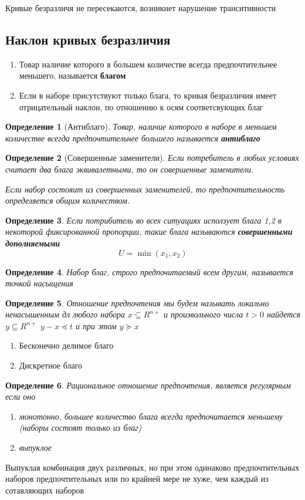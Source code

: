 \documentclass[14pt]{extarticle}
\newtheorem{definition}{Определение}
\begin{document}
	Кривые безразличя не пересекаются, возникнет нарушение транситивности
	\subsection{Наклон кривых безразличия}
	\begin{enumerate}
		\item Товар наличие которого в большем количестве
			всегда предпочтительнее меньшего, называется
			\textbf{благом}
		\item Если в наборе присутствуют только блага,
			то кривая безразличия имеет отрицательный
			наклон, по отношению к 
			осям соответсвующих благ
	\end{enumerate}
	\begin{definition}[Антиблаго]
		Товар, наличие которого
		в наборе в меньшем количестве всегда предпочтительнее большего называется \textbf{антиблаго}
	\end{definition}
	\begin{definition}[Совершенные заменители]
		Если потребитель в любых
		условиях считает два блага эквивалетными,
		то он совершенные заменители.

		Если набор состояит из совершенных
		заменителей, то предпочтительность определяется
		общим количеством.
	\end{definition}
	\begin{definition}
		Если потрибитель во всех ситуациях
		исползует блага 1,2 в некоторой
		фиксированной пропорции,
		такие блага называются \textbf{совершенными дополняемыми}
		\begin{equation} 
			U = \min(x_1,x_2)
		\end{equation} 
	\end{definition}
	\begin{definition}
		Набор благ, строго предпочитаемый всем
		другим, называется точкой насыщения
	\end{definition}
	\begin{definition}
		Отношение предпочтения
		мы будем называть локально ненасышенным
		дл любого набора
		$x \subseteq R^{n+}$ 
		и произвольного числа $t > 0$ 
		найдется  $y \subseteq R^{n + }$ 
		$y - x \preceq t$ и при этом $y \succeq x $
	\end{definition}
	\begin{enumerate}
		\item Бесконечно делимое благо
		\item Дискретное благо
	\end{enumerate}
	\begin{definition}
		Рациональное отношение 
		предпочтения, является регулярным
		если оно
		\begin{enumerate}
			\item монотонно, большее 
				количество блага всегда предпочитается меньшему (наборы состоят только из благ)
			\item выпуклое
		\end{enumerate}
	\end{definition}
	Выпуклая комбинация двух различных, но при этом
	одинаково предпочтительных наборов предпочтительных или по крайней мере не хуже, чем каждый из сотавляющих наборов
\end{document}
